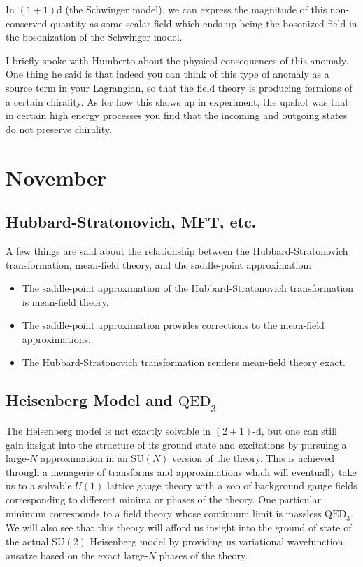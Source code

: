 \documentclass{report}
\begin{document}
In $(1+1)$d (the Schwinger model), we can express the magnitude of this
non-conserved quantity as some scalar field which ends up being the bosonized
field in the bosonization of the Schwinger model.

 I briefly spoke with Humberto 
about the physical consequences of this anomaly. One thing he said is that 
indeed you can think of this type of anomaly as a source term in your Lagrangian, 
so that the field theory is producing fermions of a certain chirality. 
As for how this shows up in experiment, the upshot was that in certain high 
energy processes you find that the incoming and outgoing states do not preserve 
chirality. 

\chapter{November}
\begin{tocbox}
\minitoc
\end{tocbox}

\section{Hubbard-Stratonovich, MFT, etc.}
A few things are said about the relationship between the Hubbard-Stratonovich 
transformation, mean-field theory, and the saddle-point approximation:
\begin{itemize}[nosep]
	\item The saddle-point approximation of the Hubbard-Stratonovich transformation 
		is mean-field theory. 
	\item The saddle-point approximation provides corrections to the mean-field 
		approximations. 
	\item The Hubbard-Stratonovich transformation renders mean-field theory 
		exact.
\end{itemize}

\section{Heisenberg Model and $\text{QED}_\text{3}$}\label{sec:heisenberg-qed3}
The Heisenberg model is not exactly solvable in $ (2+1) $-d, but one can still 
gain insight into the structure of its ground state and excitations by 
pursuing a large-$ N $ approximation in an $ \text{SU}(N) $ version of the
theory. This is achieved through a menagerie of transforms and approximations
which will eventually take us to a solvable $ U(1) $ lattice gauge theory with a
zoo of background gauge fields corresponding to different minima or phases of
the theory. One particular minimum corresponds to a field theory whose continuum
limit is massless $ \text{QED}_3 $. We will also see that this theory will
afford us insight into the ground of state of the actual $ \text{SU}(2) $
Heisenberg model by providing us variational wavefunction ansatze based on the 
exact large-$ N $ phases of the theory.
\end{document}
